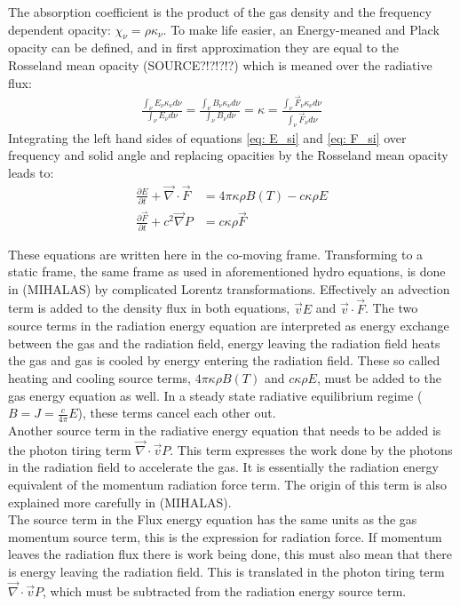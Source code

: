 The absorption coefficient is the product of the gas density and the frequency dependent opacity: $\chi_\nu = \rho \kappa_\nu$. To make life easier, an Energy-meaned and Plack opacity can be defined, and in first approximation they are equal to the Rosseland mean opacity (SOURCE?!?!?!?) which is meaned over the radiative flux:
\begin{align}
\frac{\int_\nu E_\nu \kappa_\nu d\nu}{\int_\nu E_\nu d\nu} = \frac{\int_\nu B_\nu \kappa_\nu d\nu}{\int_\nu B_\nu d\nu} = \kappa = \frac{\int_\nu \vec{F}_\nu \kappa_\nu d\nu}{\int_\nu \vec{F}_\nu d\nu}
\end{align}
Integrating the left hand sides of equations \ref{eq: E_si} and \ref{eq: F_si} over frequency and solid angle and replacing opacities by the Rosseland mean opacity leads to:
\begin{align}
\frac{\partial E}{\partial t} + \vec{\nabla} \cdot \vec{F} &= 4\pi \kappa\rho B(T) - c \kappa \rho E\\
\frac{\partial \vec{F}}{\partial t} + c^2 \vec{\nabla} P &=  c \kappa \rho \vec{F} 
\end{align}

These equations are written here in the co-moving frame. Transforming to a static frame, the same frame as used in aforementioned hydro equations, is done in \cite{} (MIHALAS) by complicated Lorentz transformations. Effectively an advection term is added to the density flux in  both equations, $\vec{v} E$ and $\vec{v} \cdot \vec{F}$. The two source terms in the radiation energy equation are interpreted as energy exchange between the gas and the radiation field, energy leaving the radiation field heats the gas and gas is cooled by energy entering the radiation field. These so called heating and cooling source terms, $4\pi \kappa\rho B(T)$ and $ c \kappa \rho E$, must be added to the gas energy equation as well. In a steady state radiative equilibrium regime ($ B = J = \frac{c}{4\pi}E$), these terms cancel each other out.\\

Another source term in the radiative energy equation that needs to be added is the photon tiring term $\vec{\nabla} \cdot \vec{v} P $. This term expresses the work done by the photons in the radiation field to accelerate the gas. It is essentially the radiation energy equivalent of the momentum radiation force term. The origin of this term is also explained more carefully in \cite{} (MIHALAS). \\

The source term in the Flux energy equation has the same units as the gas momentum source term, this is the expression for radiation force. If momentum leaves the radiation flux there is work being done, this must also mean that there is energy leaving the radiation field. This is translated in the photon tiring term $\vec{\nabla} \cdot \vec{v} P$, which must be subtracted from the radiation energy source term.

